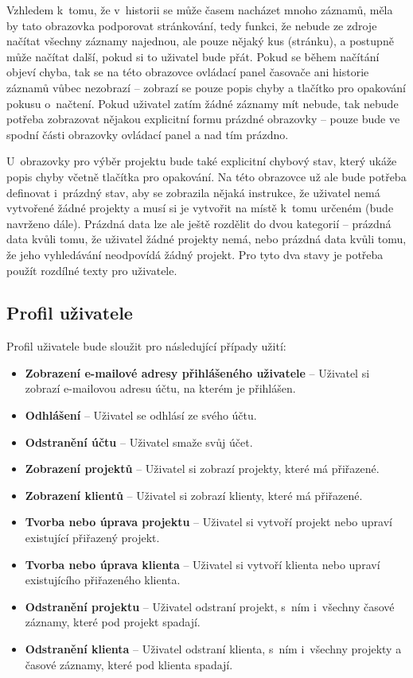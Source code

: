 Vzhledem k~tomu, že v~historii se může časem nacházet mnoho záznamů, měla by tato obrazovka podporovat stránkování, tedy funkci, že nebude ze zdroje načítat všechny záznamy najednou, ale pouze nějaký kus (stránku), a postupně může načítat další, pokud si to uživatel bude přát. Pokud se během načítání objeví chyba, tak se na této obrazovce ovládací panel časovače ani historie záznamů vůbec nezobrazí – zobrazí se pouze popis chyby a tlačítko pro opakování pokusu o~načtení. Pokud uživatel zatím žádné záznamy mít nebude, tak nebude potřeba zobrazovat nějakou explicitní formu prázdné obrazovky – pouze bude ve spodní části obrazovky ovládací panel a nad tím prázdno.

U~obrazovky pro výběr projektu bude také explicitní chybový stav, který ukáže popis chyby včetně tlačítka pro opakování. Na této obrazovce už ale bude potřeba definovat i~prázdný stav, aby se zobrazila nějaká instrukce, že uživatel nemá vytvořené žádné projekty a musí si je vytvořit na místě k~tomu určeném (bude navrženo dále). Prázdná data lze ale ještě rozdělit do dvou kategorií – prázdná data kvůli tomu, že uživatel žádné projekty nemá, nebo prázdná data kvůli tomu, že jeho vyhledávání neodpovídá žádný projekt. Pro tyto dva stavy je potřeba použít rozdílné texty pro uživatele.

\subsection{Profil uživatele}\label{feature-profile}

Profil uživatele bude sloužit pro následující případy užití:
\begin{itemize}
\item\textbf{Zobrazení e-mailové adresy přihlášeného uživatele} – Uživatel si zobrazí e-mailovou adresu účtu, na kterém je přihlášen.
\item\textbf{Odhlášení} – Uživatel se odhlásí ze svého účtu.
\item\textbf{Odstranění účtu} – Uživatel smaže svůj účet.
\item\textbf{Zobrazení projektů} – Uživatel si zobrazí projekty, které má přiřazené.
\item\textbf{Zobrazení klientů} – Uživatel si zobrazí klienty, které má přiřazené.
\item\textbf{Tvorba nebo úprava projektu} – Uživatel si vytvoří projekt nebo upraví existující přiřazený projekt.
\item\textbf{Tvorba nebo úprava klienta} – Uživatel si vytvoří klienta nebo upraví existujícího přiřazeného klienta.
\item\textbf{Odstranění projektu} – Uživatel odstraní projekt, s~ním i~všechny časové záznamy, které pod projekt spadají.
\item\textbf{Odstranění klienta} – Uživatel odstraní klienta, s~ním i~všechny projekty a časové záznamy, které pod klienta spadají.
\end{itemize}

